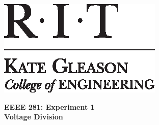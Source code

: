 \documentclass[11pt]{article}
\begin{document}
	\hspace{6in}
		\includegraphics[scale=0.9,trim=0cm 0in 0in 0.0in,clip]{RIT_KGCOE1}
\newline

\Huge \textbf{EEEE 281: Experiment 1 \\Voltage Division}\\
\end{document}
